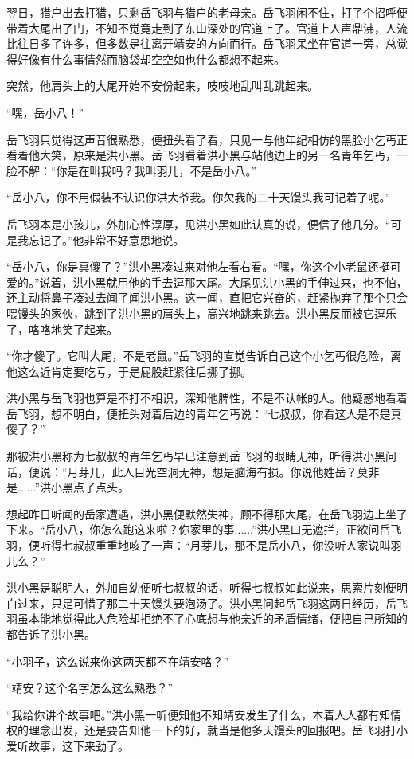 翌日，猎户出去打猎，只剩岳飞羽与猎户的老母亲。岳飞羽闲不住，打了个招呼便带着大尾出了门，不知不觉竟走到了东山深处的官道上了。官道上人声鼎沸，人流比往日多了许多，但多数是往离开靖安的方向而行。岳飞羽呆坐在官道一旁，总觉得好像有什么事情然而脑袋却空空如也什么都想不起来。

突然，他肩头上的大尾开始不安份起来，吱吱地乱叫乱跳起来。

“嘿，岳小八！”

岳飞羽只觉得这声音很熟悉，便扭头看了看，只见一与他年纪相仿的黑脸小乞丐正看着他大笑，原来是洪小黑。岳飞羽看着洪小黑与站他边上的另一名青年乞丐，一脸不解：“你是在叫我吗？我叫羽儿，不是岳小八。”

“岳小八，你不用假装不认识你洪大爷我。你欠我的二十天馒头我可记着了呢。”

岳飞羽本是小孩儿，外加心性淳厚，见洪小黑如此认真的说，便信了他几分。“可是我忘记了。”他非常不好意思地说。

“岳小八，你是真傻了？”洪小黑凑过来对他左看右看。“嘿，你这个小老鼠还挺可爱的。”说着，洪小黑就用他的手去逗那大尾。大尾见洪小黑的手伸过来，也不怕，还主动将鼻子凑过去闻了闻洪小黑。这一闻，直把它兴奋的，赶紧抛弃了那个只会喂馒头的家伙，跳到了洪小黑的肩头上，高兴地跳来跳去。洪小黑反而被它逗乐了，咯咯地笑了起来。

“你才傻了。它叫大尾，不是老鼠。”岳飞羽的直觉告诉自己这个小乞丐很危险，离他这么近肯定要吃亏，于是屁股赶紧往后挪了挪。

洪小黑与岳飞羽也算是不打不相识，深知他脾性，不是不认帐的人。他疑惑地看着岳飞羽，想不明白，便扭头对着后边的青年乞丐说：“七叔叔，你看这人是不是真傻了？”

那被洪小黑称为七叔叔的青年乞丐早已注意到岳飞羽的眼睛无神，听得洪小黑问话，便说：“月芽儿，此人目光空洞无神，想是脑海有损。你说他姓岳？莫非是......”洪小黑点了点头。

想起昨日听闻的岳家遭遇，洪小黑便默然失神，顾不得那大尾，在岳飞羽边上坐了下来。“岳小八，你怎么跑这来啦？你家里的事......”洪小黑口无遮拦，正欲问岳飞羽，便听得七叔叔重重地咳了一声：“月芽儿，那不是岳小八，你没听人家说叫羽儿么？”

洪小黑是聪明人，外加自幼便听七叔叔的话，听得七叔叔如此说来，思索片刻便明白过来，只是可惜了那二十天馒头要泡汤了。洪小黑问起岳飞羽这两日经历，岳飞羽虽本能地觉得此人危险却拒绝不了心底想与他亲近的矛盾情绪，便把自己所知的都告诉了洪小黑。

“小羽子，这么说来你这两天都不在靖安咯？”

“靖安？这个名字怎么这么熟悉？”

“我给你讲个故事吧。”洪小黑一听便知他不知靖安发生了什么，本着人人都有知情权的理念出发，还是要告知他一下的好，就当是他多天馒头的回报吧。岳飞羽打小爱听故事，这下来劲了。

